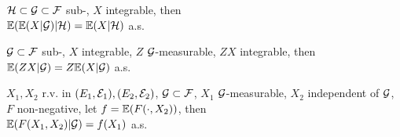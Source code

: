 \begin{prop}
    $\mathcal{H} \subset \mathcal{G} \subset \mathcal{F}$ sub-\sa, $X$ integrable, then \\
    $\mathbb{E}(\mathbb{E}(X|\mathcal{G})|\mathcal{H}) = \mathbb{E}(X|\mathcal{H})$ a.s.\
\end{prop}

\begin{prop}
    $\mathcal{G} \subset \mathcal{F}$ sub-\sa, $X$ integrable, $Z$ $\mathcal{G}$-measurable, $ZX$ integrable, then \\
    $\mathbb{E}(ZX|\mathcal{G}) = Z\mathbb{E}(X|\mathcal{G})$ a.s.\
\end{prop}

\begin{prop}
    $X_1, X_2$ r.v. in $(E_1, \mathcal{E}_1), (E_2, \mathcal{E}_2)$, $\mathcal{G} \subset \mathcal{F}$, $X_1$ $\mathcal{G}$-measurable, $X_2$ independent of $\mathcal{G}$, $F$ non-negative, let $f = \mathbb{E}(F(\cdot, X_2))$, then \\
    $\mathbb{E}(F(X_1, X_2)|\mathcal{G}) = f(X_1)$ a.s.
\end{prop}

